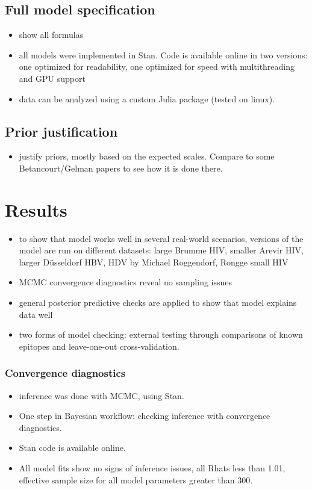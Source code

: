 \documentclass[fleqn,11pt]{SelfArx} %
\begin{document}
\subsection*{Full model specification}
\begin{itemize}
  \item show all formulas
  \item all models were implemented in Stan. Code is available online in two versions: one optimized for readability, one optimized for speed with multithreading and GPU support
  \item data can be analyzed using a custom Julia package (tested on linux).
\end{itemize}

\subsection*{Prior justification}
\begin{itemize}
  \item justify priors, mostly based on the expected scales. Compare to some 
  Betancourt/Gelman papers to see how it is done there.
\end{itemize}

\section{Results}

\begin{itemize}
  \item to show that model works well in several real-world scenarios, versions of the model are run on different datasets: large Brumme HIV, smaller Arevir HIV, larger Düsseldorf HBV, HDV by Michael Roggendorf, Rongge small HIV
  \item MCMC convergence diagnostics reveal no sampling issues
  \item general posterior predictive checks are applied to show that model explains data well
  \item two forms of model checking: external testing through comparisons of known epitopes and leave-one-out cross-validation.
\end{itemize}

\subsubsection*{Convergence diagnostics}

\begin{itemize}
  \item inference was done with MCMC, using Stan.
  \item One step in Bayesian workflow: checking inference with convergence diagnostics.
  \item Stan code is available online.
  \item All model fits show no signs of inference issues, all Rhats less than 1.01,
    effective sample size for all model parameters greater than 300.
\end{itemize}
\end{document}
